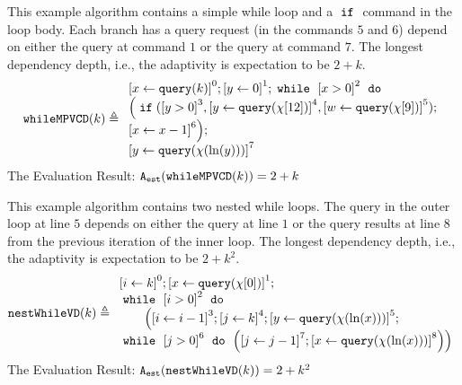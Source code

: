    \begin{example}
\label{ex:whileMPVCD}
%
This example algorithm contains a simple while loop and a $\;\mathtt{if}\;$ command in the loop body.
Each branch  has a query request (in the commands $5$ and $6$)
depend on either the query at command $1$ or the query at command $7$.
The longest dependency depth, i.e., the adaptivity is expectation to be $2 + k$.
\[
    \kw{whileMPVCD}(k) \triangleq
    \begin{array}{l}
        \clabel{ \assign{x}{\query(k)}}^{0} ; 
        \clabel{\assign{y}{0} }^{1} ; 
            \ewhile ~ \clabel{x > 0}^{2} ~ \edo ~ \\
            \Big(
             \eif(\clabel{y > 0}^{3}, 
             \clabel{\assign{y}{\query(\chi[12])}}^{4}, 
             \clabel{\assign{w}{\query(\chi[9])}}^{5});        
             \\
             \clabel{\assign{x}{x-1}}^{6}\Big);\\
             \clabel{\assign{y}{\query(\chi(\ln(y)))} }^{7} 
        \end{array}
    \]
    The Evaluation Result: $ {\mathtt{A_{est}}}(\mathtt{whileMPVCD}(k)) = 2 + k $
\end{example}
\begin{example}
    \label{ex:nestWhileVD}
    This example algorithm contains two nested while loops.
    The query in the outer loop at line $5$ depends on either the query at line $1$ or
    the query results at line $8$ from the previous iteration of the inner loop.
    The longest dependency depth, i.e., the adaptivity is expectation to be $2 + k^2$.
    \[
    \kw{nestWhileVD}(k) \triangleq 
    \begin{array}{l}
        \clabel{ \assign{i}{k} }^{0} ; 
        \clabel{\assign{x}{\query(\chi[0])}}^{1} ; \\
            \ewhile ~ \clabel{i > 0}^{2} ~ \edo ~ \\
            \qquad \Big(
             \clabel{\assign{i}{i-1}}^{3} ;
             \clabel{\assign{j}{k}}^{4} ;
             \clabel{\assign{y}{\query(\chi(\ln(x)))} }^{5}  ; \\
             \ewhile ~ \clabel{j > 0}^{6} ~ \edo ~ 
             \Big(
              \clabel{\assign{j}{j-1}}^{7};
              \clabel{\assign{x}{\query(\chi(\ln(x)))} }^{8}
              \Big) \Big)
        \end{array}
    \]
    The Evaluation Result: $ {\mathtt{A_{est}}}(\mathtt{nestWhileVD}(k)) = 2 + k^2 $
\end{example}
    

